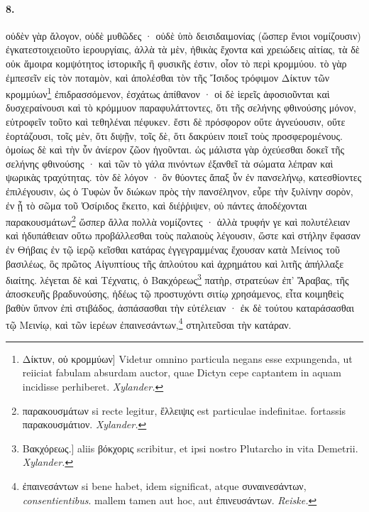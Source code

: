 \documentclass[a4paper, 11pt, oneside, polutonikogreek, german, landscape]{article}
\begin{document}
\paragraph{8.}
οὐδὲν γὰρ ἄλογον, οὐδὲ μυθῶδες · οὐδὲ ὑπὸ δεισιδαιμονίας (ὥσπερ ἔνιοι νομίζουσιν) ἐγκατεστοιχειοῦτο ἱερουργίαις, ἀλλὰ τὰ μὲν, ἠθικὰς ἔχοντα καὶ χρειώδεις αἰτίας, τὰ δὲ οὐκ ἄμοιρα κομψότητος ἱστορικῆς ἢ φυσικῆς ἐστιν, οἷον τὸ περὶ κρομμύου. τὸ γὰρ ἐμπεσεῖν εἰς τὸν ποταμὸν, καὶ ἀπολέσθαι τὸν τῆς Ἴσιδος τρόφιμον Δίκτυν τῶν κρομμύων\footnote{Δίκτυν, οὐ κρομμύων] Videtur omnino particula negans esse expungenda, ut reiiciat fabulam absurdam auctor, quae Dictyn cepe captantem in aquam incidisse perhiberet. \emph{Xylander.}} ἐπιδρασσόμενον, ἐσχάτως ἀπίθανον · οἱ δὲ ἱερεῖς ἀφοσιοῦνται καὶ δυσχεραίνουσι καὶ τὸ κρόμμυον παραφυλάττοντες, ὅτι τῆς σελήνης φθινούσης μόνον, εὐτροφεῖν τοῦτο καὶ τεθηλέναι πέφυκεν. ἔστι δὲ πρόσφορον οὔτε ἁγνεύουσιν, οὔτε ἑορτάζουσι, τοῖς μὲν, ὅτι διψῇν, τοῖς δὲ, ὅτι δακρύειν ποιεῖ τοὺς προσφερομένους. ὁμοίως δὲ καὶ τὴν ὗν ἀνίερον ζῶον ἡγοῦνται. ὡς μάλιστα γὰρ ὀχεύεσθαι δοκεῖ τῆς σελήνης φθινούσης · καὶ τῶν τὸ γάλα πινόντων ἐξανθεῖ τὰ σώματα λέπραν καὶ ψωρικὰς τραχύτητας. τὸν δὲ λόγον · ὃν θύοντες ἅπαξ ὗν ἐν πανσελήνῳ, κατεσθίοντες ἐπιλέγουσιν, ὡς ὁ Τυφὼν ὗν διώκων πρὸς τὴν πανσέληνον, εὗρε τὴν ξυλίνην σορὸν, ἐν ᾗ τὸ σῶμα τοῦ Ὀσίριδος ἔκειτο, καὶ διέῤῥιψεν, οὐ πάντες ἀποδέχονται παρακουσμάτων\footnote{παρακουσμάτων si recte legitur, ἔλλειψις est particulae indefinitae. fortassis παρακουσμάτιον. \emph{Xylander.}} ὥσπερ ἄλλα πολλὰ νομίζοντες · ἀλλὰ τρυφήν γε καὶ πολυτέλειαν καὶ ἡδυπάθειαν οὕτω προβάλλεσθαι τοὺς παλαιοὺς λέγουσιν, ὥστε καὶ στήλην ἔφασαν ἐν Θήβαις ἐν τῷ ἱερῷ κεῖσθαι κατάρας ἐγγεγραμμένας ἔχουσαν κατὰ Μείνιος τοῦ βασιλέως, ὃς πρῶτος Αἰγυπτίους τῆς ἀπλούτου καὶ ἀχρημάτου καὶ λιτῆς ἀπήλλαξε διαίτης. λέγεται δὲ καὶ Τέχνατις, ὁ Βακχόρεως\footnote{Βακχόρεως.] aliis βόκχορις scribitur, et ipsi nostro Plutarcho in vita Demetrii. \emph{Xylander.}} πατὴρ, στρατεύων ἐπ' Ἄραβας, τῆς ἀποσκευῆς βραδυνούσης, ἡδέως τῷ προστυχόντι σιτίῳ χρησάμενος, εἶτα κοιμηθεὶς βαθὺν ὕπνον ἐπὶ στιβάδος, ἀσπάσασθαι τὴν εὐτέλειαν · ἐκ δὲ τούτου καταράσασθαι τῷ Μεινίῳ, καὶ τῶν ἱερέων ἐπαινεσάντων,\footnote{ἐπαινεσάντων si bene habet, idem significat, atque συναινεσάντων, \emph{consentientibus}. mallem tamen aut hoc, aut ἐπινευσάντων. \emph{Reiske.}} στηλιτεῦσαι τὴν κατάραν.
\end{document}
